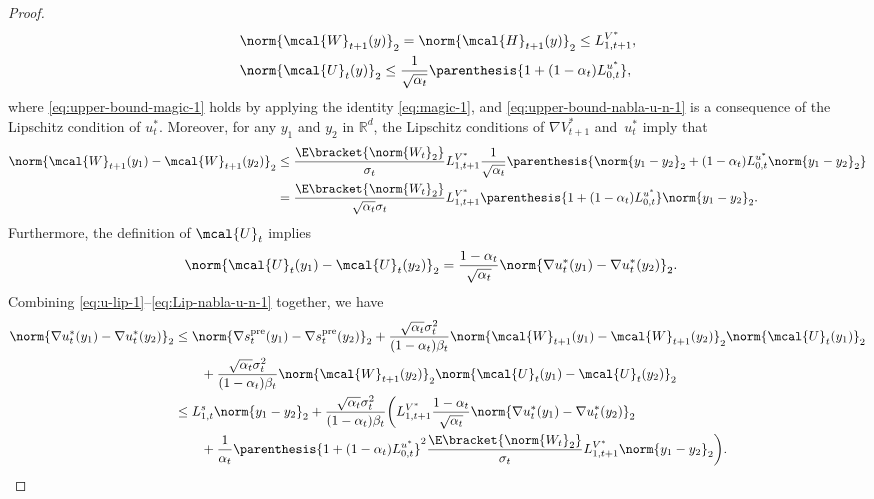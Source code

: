 \documentclass{article}
\newcommand{\R}{\mathbb{R}}
\begin{document}
\begin{proof}
\begin{align}
    & \norm{\mcal{W}_{t+1}(y)}_{2} = \norm{\mcal{H}_{t+1}(y)}_2 \leq L_{1, t+1}^{V^*}, \label{eq:upper-bound-magic-1} \\ 
    & \norm{\mcal{U}_t(y)}_2 \leq \frac{1}{\sqrt{\alpha_{t}}}\parenthesis{1 + (1 - \alpha_{t})L_{0,t}^{u^{*}}}, \label{eq:upper-bound-nabla-u-n-1}
\end{align}
where \eqref{eq:upper-bound-magic-1} holds by applying the identity \eqref{eq:magic-1}, and \eqref{eq:upper-bound-nabla-u-n-1} is a consequence of the Lipschitz condition of $ u_{t}^{*} $.
Moreover, for any $ y_{1} $ and $ y_{2} $ in $\R^d$, the Lipschitz conditions of $ \nabla {V}^*_{t+1} $ and~$ u_{t}^{*} $ imply that
\begin{align}
     \norm{\mcal{W}_{t+1}(y_1) - \mcal{W}_{t+1}(y_2)}_2 \nonumber &  \leq \frac{\E\bracket{\norm{W_{t}}_2}}{\sigma_{t}}L_{1, t+1}^{{V}^*}\frac{1}{\sqrt{\alpha_{t}}}\parenthesis{\norm{y_{1} - y_{2}}_2 + (1 - \alpha_{t})L_{0, t}^{u^{*}}\norm{y_{1} - y_{2}}_2} \nonumber \\ & = \frac{\E\bracket{\norm{W_{t}}_2}}{\sqrt{\alpha_{t}}\sigma_{t}}L_{1, t+1}^{V^{*}}\parenthesis{1 + (1 - \alpha_{t})L_{0, t}^{u^{*}}}\norm{y_{1} - y_{2}}_2. \label{eq:Lip-nabla-V-w-1}
\end{align}
Furthermore, the definition of $\mcal{U}_t$ implies
\begin{align}
    \norm{\mcal{U}_t(y_1) - \mcal{U}_t(y_2)}_2 & = \frac{1 - \alpha_{t}}{\sqrt{\alpha_{t}}}\norm{\nabla u_{t}^{*}(y_{1}) - \nabla u_{t}^{*}(y_{2})}_2 \label{eq:Lip-nabla-u-n-1}.
\end{align}
Combining \eqref{eq:u-lip-1}--\eqref{eq:Lip-nabla-u-n-1} together, we have
\begin{align*}
    \norm{\nabla u_{t}^{*}(y_{1}) - \nabla u_{t}^{*}(y_{2})}_2 & \leq \norm{\nabla s_{t}^{\rm pre}(y_{1}) - \nabla s_{t}^{\rm pre}(y_{2})}_2  +  \frac{\sqrt{\alpha_{t}}\sigma_{t}^{2}}{(1 - \alpha_{t})\beta_t} \norm{\mcal{W}_{t+1}(y_1)  - \mcal{W}_{t+1}(y_2)}_2\norm{\mcal{U}_t(y_1)}_2 \\ & \qquad + \frac{\sqrt{\alpha_{t}}\sigma_{t}^{2}}{(1 - \alpha_{t})\beta_t} \norm{\mcal{W}_{t+1}(y_2)}_2\norm{\mcal{U}_t(y_1) - \mcal{U}_t(y_2)}_2 
    \\ & \leq L_{1, t}^{s}\norm{y_{1} - y_{2}}_2 + \frac{\sqrt{\alpha_{t}}\sigma_{t}^{2}}{(1 - \alpha_{t})\beta_t}\bigg(L_{1, t+1}^{V^{*}}\frac{1 - \alpha_{t}}{\sqrt{\alpha_{t}}} \norm{\nabla u_{t}^{*}(y_{1}) - \nabla u_{t}^{*}(y_{2})}_2 \\ & \qquad + \frac{1}{\alpha_{t}}\parenthesis{1 + (1 - \alpha_{t})L_{0,t}^{u^{*}}}^{2}\frac{\E\bracket{\norm{W_{t}}_2}}{\sigma_{t}}L_{1, t+1}^{V^{*}}\norm{y_{1} - y_{2}}_2\bigg).

\end{align*}
\end{proof}
\end{document}

